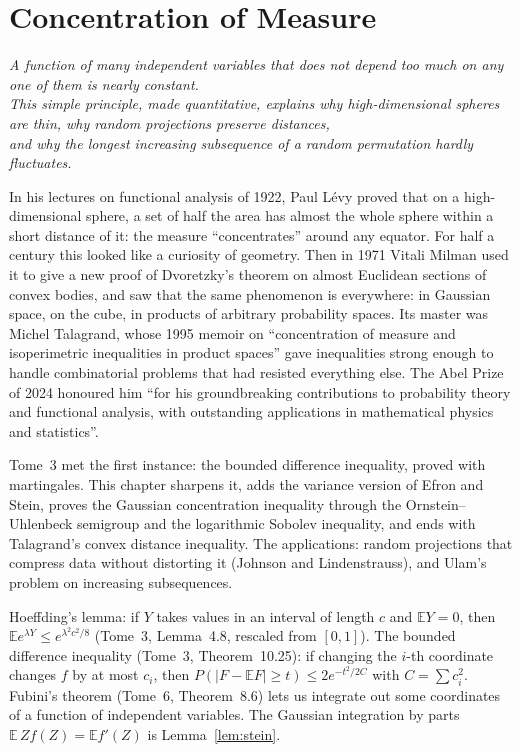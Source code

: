 \chapter{Concentration of Measure}
\begin{center}\itshape
A function of many independent variables that does not depend too much on any one of them is nearly constant.\\
This simple principle, made quantitative, explains why high-dimensional spheres are thin, why random projections preserve distances,\\
and why the longest increasing subsequence of a random permutation hardly fluctuates.
\end{center}

In his lectures on functional analysis of 1922, Paul L\'evy proved that on a high-dimensional sphere, a set of half the area has almost the whole sphere within a short distance of it: the
measure ``concentrates'' around any equator. For half a century this looked like a curiosity of geometry. Then in 1971 Vitali Milman used it to give a new
proof of Dvoretzky's theorem on almost Euclidean sections of convex bodies, and saw that the same phenomenon is everywhere: in Gaussian space, on the cube,
in products of arbitrary probability spaces. Its master was Michel Talagrand, whose 1995 memoir on ``concentration of measure and isoperimetric inequalities
in product spaces'' gave inequalities strong enough to handle combinatorial problems that had resisted everything else. The Abel Prize of 2024 honoured him
``for his groundbreaking contributions to probability theory and functional analysis, with outstanding applications in mathematical physics and statistics''.

Tome~3 met the first instance: the bounded difference inequality, proved with martingales. This chapter sharpens it, adds the variance version of
Efron and Stein, proves the Gaussian concentration inequality through the Ornstein--Uhlenbeck semigroup and the logarithmic Sobolev inequality, and ends with
Talagrand's convex distance inequality. The applications: random projections that compress data without distorting it (Johnson and Lindenstrauss), and Ulam's
problem on increasing subsequences.

\begin{reminder}
Hoeffding's lemma: if $Y$ takes values in an interval of length $c$ and $\mathbb EY=0$, then $\mathbb Ee^{\lambda Y}\le e^{\lambda^2c^2/8}$ (Tome~3, Lemma~4.8, rescaled from $[0,1]$).
The bounded difference inequality (Tome~3, Theorem~10.25): if changing the $i$-th coordinate changes $f$ by at most $c_i$, then
$P(|F-\mathbb EF|\ge t)\le2e^{-t^2/2C}$ with $C=\sum c_i^2$. Fubini's theorem (Tome~6, Theorem~8.6) lets us integrate out some coordinates of a function of independent
variables. The Gaussian integration by parts $\mathbb E\,Zf(Z)=\mathbb Ef'(Z)$ is Lemma~\ref{lem:stein}.
\end{reminder}

